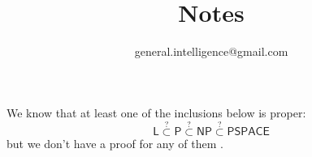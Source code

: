 

\title{Notes}
\author{ {\footnotesize general.intelligence@gmail.com}}


	
\maketitle

We know that at least one of the inclusions below is proper:
\begin{equation}
\mathsf{L} \stackrel{?}{\subset} \mathsf{P} \stackrel{?}{\subset} \mathsf{NP} \stackrel{?}{\subset} \mathsf{PSPACE}
\end{equation}
but we don't have a proof for any of them \parencite{Moore2011}. %

